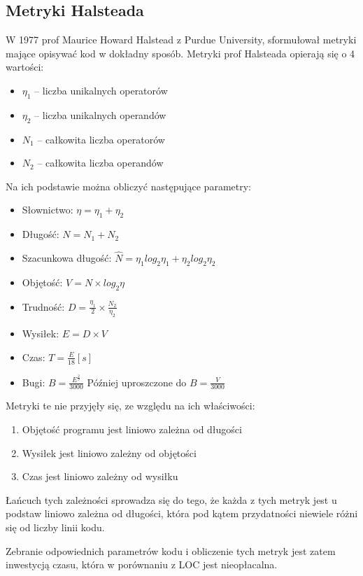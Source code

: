 \subsection{Metryki Halsteada}
W 1977 prof Maurice Howard Halstead z Purdue University, sformułował metryki mające opisywać kod w dokładny sposób.\cite{halstead1977elements}
Metryki prof Halsteada opierają się o 4 wartości:
\begin{itemize}
    \item $\eta_1$ -- liczba unikalnych operatorów
    \item $\eta_2$ -- liczba unikalnych operandów
    \item $N_1$ -- całkowita liczba operatorów
    \item $N_2$ -- całkowita liczba operandów
\end{itemize}
Na ich podstawie można obliczyć następujące parametry:
\begin{itemize}
    \item Słownictwo: $\eta = \eta_1 + \eta_2$
    \item Długość: $N = N_1 + N_2$
    \item Szacunkowa długość: $\hat{N} = \eta_1log_2\eta_1 + \eta_2log_2\eta_2$
    \item Objętość: $V = N \times log_2\eta$
    \item Trudność: $D = \frac{\eta_1}{2} \times \frac{N_2}{\eta_2}$
    \item Wysiłek: $E = D \times V$
    \item Czas: $T = \frac{E}{18}[s]$
    \item Bugi: $B = \frac{E^{\frac{2}{3}}}{3000}$ Później uproszczone do $B = \frac{V}{3000}$
\end{itemize}
\newpage
Metryki te nie przyjęły się, ze względu na ich właściwości:
\begin{enumerate}
    \item Objętość programu jest liniowo zależna od długości
    \item Wysiłek jest liniowo zależny od objętości
    \item Czas jest liniowo zależny od wysiłku
\end{enumerate}
Łańcuch tych zależności sprowadza się do tego, że każda z tych metryk jest u podstaw liniowo zależna od długości, która pod kątem przydatności niewiele różni się od liczby linii kodu.

Zebranie odpowiednich parametrów kodu i obliczenie tych metryk jest zatem inwestycją czasu, która w porównaniu z LOC jest nieopłacalna.

